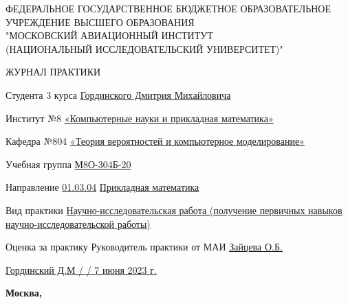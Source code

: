\begin{titlepage}
\begin{center}
\bfseries

{\Large ФЕДЕРАЛЬНОЕ ГОСУДАРСТВЕННОЕ БЮДЖЕТНОЕ ОБРАЗОВАТЕЛЬНОЕ\\ УЧРЕЖДЕНИЕ ВЫСШЕГО ОБРАЗОВАНИЯ\\ "МОСКОВСКИЙ АВИАЦИОННЫЙ ИНСТИТУТ\\ (НАЦИОНАЛЬНЫЙ ИССЛЕДОВАТЕЛЬСКИЙ УНИВЕРСИТЕТ)"

}

\vspace{56pt}

{\large ЖУРНАЛ ПРАКТИКИ 

}

\end{center}

\vspace{36pt}

Студента 3 курса \hspace{3cm}        \underline{Гординского Дмитрия Михайловича}

\vspace{26pt}

Институт №8 \underline{«Компьютерные науки и прикладная математика»}

\vspace{26pt}

Кафедра №804 \underline{«Теория вероятностей и компьютерное моделирование»}

\vspace{26pt}

Учебная группа \underline{М8О-304Б-20}

\vspace{26pt}

Направление \underline{01.03.04} \hspace{3cm} \underline{Прикладная математика}

\vspace{26pt}

Вид практики \underline{Научно-исследовательская работа }
\vspace{4pt}
\underline{(получение первичных навыков научно-исследовательской работы)}

\vspace{26pt}

Оценка за практику \underline{ \hspace{3cm}} Руководитель практики от МАИ \underline{Зайцева О.Б.}

\vspace{46pt}

\underline{Гординский Д.М / \hspace{3cm} / 7 июня 2023 г.}

\vfill

\begin{center}
\bfseries
Москва, \the\year
\end{center}
\end{titlepage}

\pagebreak
